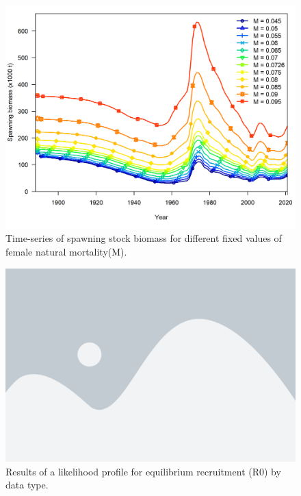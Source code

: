 \documentclass[11pt,
  english,
  a4paper,
]{article}
\begin{document}
\tagmcend\tagstructend


\begin{figure}
\centering
\includegraphics[width=1\textwidth,height=1\textheight]{figs/sens_m_ssb.png}
\caption{Time-series of spawning stock biomass for different fixed values of female natural mortality(M).\label{fig:sens_m_ssb}}
\end{figure}

\tagmcend\tagstructend


\begin{figure}
\centering
\includegraphics[width=1\textwidth,height=1\textheight]{figs/placeholder.png}
\caption{Results of a likelihood profile for equilibrium recruitment (R0) by data type.\label{fig:sens_R0_like}}
\end{figure}
\end{document}
